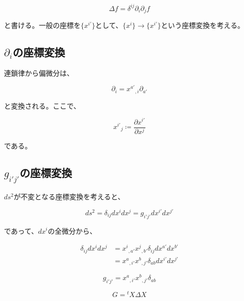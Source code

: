 \documentclass[a4paper,11pt]{article}
\begin{document}
\begin{equation}
  \Delta f = \delta^{ij} \partial_{i} \partial_{j} f
\end{equation}

\noindent
と書ける。一般の座標を$\{x^{i'}\}$として、$\{x^i\}\to\{x^{i'}\}$という座標変換を考える。

\subsection{$\partial_{i}$の座標変換}%


連鎖律から偏微分は、

\begin{equation}
  \boxed{
    \partial_{i} = x^{a'}{}_{,i}\partial_{a'}
  }
\end{equation}

\noindent
と変換される。ここで、

\begin{equation}
  x^{i'}{}_{j} \coloneqq \frac{\partial{x^{i'}}}{\partial{x^{j}}}
\end{equation}

\noindent
である。

\subsection{$g_{i'j'}$の座標変換}%


$ds^2$が不変となる座標変換を考えると、

\begin{equation}
  ds^2 = \delta_{ij}dx^{i}dx^{j} = g_{i'j'}dx^{i'}dx^{j'}
\end{equation}

\noindent
であって、$dx^{i}$の全微分から、

\begin{align}
  \delta_{ij}dx^{i}dx^{j} & = x^{i}{}_{,a'}x^{j}{}_{,b'}\delta_{ij}dx^{a'}dx^{b'} \nonumber \\
                          & = x^{a}{}_{,i'}x^{b}{}_{,j'}\delta_{ab}dx^{i'}dx^{j'}
\end{align}

\noindent

\begin{equation}
  \boxed{
  g_{i'j'} = x^{a}{}_{,i'}x^{b}{}_{,j'}\delta_{ab}
  \label{eq:metric_transform}
  }
\end{equation}

\begin{equation}
  G = {}^t\! X \Delta X
\end{equation}
\end{document}
